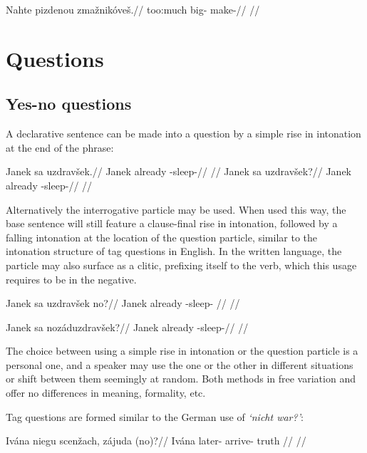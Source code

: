 \ex
\begingl
\gla Nahte pizdenou zma\v{z}nik\'ove\v{s}.//
\glb too:much big- make-//
\glft {}//
\endgl
\xe

\section{Questions}

\subsection{Yes-no questions}

A declarative sentence can be made into a question by a simple rise in intonation at the end of the phrase:

\pex
\a
\begingl
\gla Janek sa uzdrav\v{s}ek.//
\glb Janek already -sleep-//
\glft {}//
\endgl
\a
\begingl
\gla Janek sa uzdrav\v{s}ek?//
\glb Janek already -sleep-//
\glft {}//
\endgl
\xe

Alternatively the interrogative particle  may be used. When used this way, the base sentence will still feature a clause-final rise in intonation, followed by a falling intonation at the location of the question particle, similar to the intonation structure of tag questions in English. In the written language, the particle  may also surface as a clitic, prefixing itself to the verb, which this usage requires to be in the negative.

\pex
\begingl
\gla Janek sa uzdrav\v{s}ek no?//
\glb Janek already -sleep- //
\glft {}//
\endgl
\xe

\pex
\begingl
\gla Janek sa noz\'aduzdrav\v{s}ek?//
\glb Janek already -sleep-//
\glft {}//
\endgl
\xe

The choice between using a simple rise in intonation or the question particle  is a personal one, and a speaker may use the one or the other in different situations or shift between them seemingly at random. Both methods in free variation and offer no differences in meaning, formality, etc.

Tag questions are formed similar to the German use of \emph{`nicht war?'}:

\pex
\begingl
\gla Iv\'ana niegu scen\v{z}ach, z\'ajuda (no)?//
\glb Iv\'ana later- arrive- truth //
\glft {}//
\endgl
\xe

